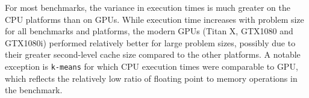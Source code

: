 \documentclass[../document.tex]{subfiles}
\begin{document}
For most benchmarks, the variance in execution times is much greater on the CPU platforms than on GPUs.
While execution time increases with problem size for all benchmarks and platforms, the modern GPUs (Titan X, GTX1080 and GTX1080i) performed relatively better for large problem sizes, possibly due to their greater second-level cache size compared to the other platforms.
A notable exception is {\tt k-means} for which CPU execution times were comparable to GPU, which reflects the relatively low ratio of floating point to memory operations in the benchmark.


\end{document}

